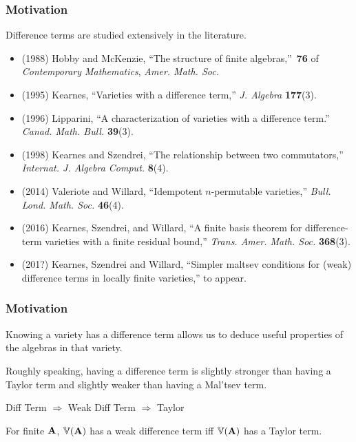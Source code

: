 \documentclass[12pt,xcolor=dvipsnames%
   ]{beamer}
\begin{document}
\begin{frame}
  \frametitle{Motivation}
Difference terms are studied extensively in the literature.

\begin{itemize}


\item
  {\footnotesize (1988)
    Hobby and McKenzie, ``The structure of finite algebras,''~{\bf 76} of
    {\em Contemporary Mathematics}, {\em Amer. Math. Soc.} }
\item
  {\footnotesize (1995) 
    Kearnes, ``Varieties with a difference term,'' 
    {\em J. Algebra} {\bf 177}(3).}
\item
  {\footnotesize (1996)
    Lipparini, ``A characterization of varieties with a difference term.''
    {\em Canad. Math. Bull.} {\bf 39}(3).}
\item
  {\footnotesize (1998)
    Kearnes and Szendrei, ``The relationship between two commutators,''
    {\em Internat. J. Algebra Comput.} {\bf 8}(4). } 
\item
  {\footnotesize (2014)
    Valeriote and Willard, ``Idempotent {$n$}-permutable varieties,'' 
    {\em Bull. Lond. Math. Soc.} {\bf 46}(4).}
\item
  {\footnotesize (2016)
    Kearnes, Szendrei, and Willard, ``A finite basis theorem for
    difference-term varieties with a finite residual bound,'' 
    {\em Trans. Amer. Math. Soc.} {\bf 368}(3).}
\item
  {\footnotesize (201?)
  Kearnes, Szendrei and Willard, ``Simpler maltsev conditions for (weak)
  difference terms in locally finite varieties,'' to appear.}
\end{itemize}
\end{frame}


\begin{frame}
  \frametitle{Motivation}
  Knowing a variety has a difference term allows us to deduce useful
  properties of the algebras in that variety.

  Roughly speaking, having a difference term is slightly stronger than having
  a Taylor term and slightly weaker than having a Mal'tsev term.

  Diff Term $\Rightarrow$ Weak Diff Term $\Rightarrow$  Taylor
  
  For finite $\mathbf{A}$, $\operatorname{\mathbb{V}}(\mathbf{A})$ has a weak difference term iff
  $\operatorname{\mathbb{V}}(\mathbf{A})$ has a  Taylor term.
\end{frame}
\end{document}
